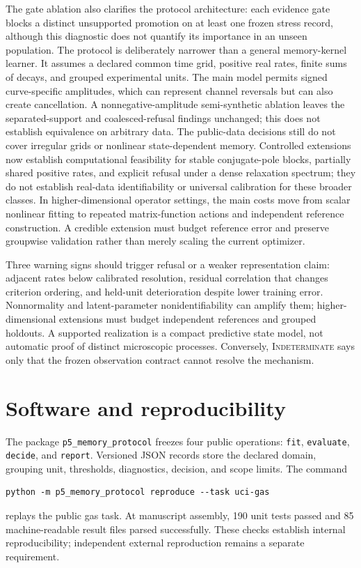 \documentclass[11pt]{article}
\newcommand{\indet}{\textsc{Indeterminate}}
\begin{document}
The gate ablation also clarifies the protocol architecture: each evidence gate blocks a distinct unsupported promotion on at least one frozen stress record, although this diagnostic does not quantify its importance in an unseen population. The protocol is deliberately narrower than a general memory-kernel learner. It assumes a declared common time grid, positive real rates, finite sums of decays, and grouped experimental units. The main model permits signed curve-specific amplitudes, which can represent channel reversals but can also create cancellation. A nonnegative-amplitude semi-synthetic ablation leaves the separated-support and coalesced-refusal findings unchanged; this does not establish equivalence on arbitrary data. The public-data decisions still do not cover irregular grids or nonlinear state-dependent memory. Controlled extensions now establish computational feasibility for stable conjugate-pole blocks, partially shared positive rates, and explicit refusal under a dense relaxation spectrum; they do not establish real-data identifiability or universal calibration for these broader classes. In higher-dimensional operator settings, the main costs move from scalar nonlinear fitting to repeated matrix-function actions and independent reference construction. A credible extension must budget reference error and preserve groupwise validation rather than merely scaling the current optimizer.

Three warning signs should trigger refusal or a weaker representation claim: adjacent rates below calibrated resolution, residual correlation that changes criterion ordering, and held-unit deterioration despite lower training error. Nonnormality and latent-parameter nonidentifiability can amplify them; higher-dimensional extensions must budget independent references and grouped holdouts. A supported realization is a compact predictive state model, not automatic proof of distinct microscopic processes. Conversely, \indet{} says only that the frozen observation contract cannot resolve the mechanism.

\section{Software and reproducibility}
The package \texttt{p5\_memory\_protocol} freezes four public operations: \texttt{fit}, \texttt{evaluate}, \texttt{decide}, and \texttt{report}. Versioned JSON records store the declared domain, grouping unit, thresholds, diagnostics, decision, and scope limits. The command
\begin{verbatim}
python -m p5_memory_protocol reproduce --task uci-gas
\end{verbatim}
replays the public gas task. At manuscript assembly, 190 unit tests passed and 85 machine-readable result files parsed successfully. These checks establish internal reproducibility; independent external reproduction remains a separate requirement.
\end{document}
